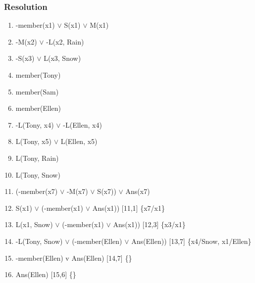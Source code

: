 \documentclass[compress, 9pt]{beamer}
\begin{document}
\begin{frame}
\frametitle{Resolution}
\label{sec-4-4}

\begin{enumerate}
\item -member(x1) $\vee$ S(x1) $\vee$ M(x1)
\item -M(x2) $\vee$ -L(x2, Rain)
\item -S(x3) $\vee$ L(x3, Snow)
\item member(Tony)
\item member(Sam)
\item member(Ellen)
\item -L(Tony, x4) $\vee$ -L(Ellen, x4)
\item L(Tony, x5) $\vee$ L(Ellen, x5)
\item L(Tony, Rain)
\item L(Tony, Snow)
\item (-member(x7) $\vee$ -M(x7) $\vee$ S(x7)) $\vee$ Ans(x7)
\item <2-> S(x1) $\vee$ (-member(x1) $\vee$ Ans(x1)) [11,1]      \{x7/x1\}
\item <3-> L(x1, Snow) $\vee$ (-member(x1) $\vee$ Ans(x1)) [12,3] \{x3/x1\}
\item <4-> -L(Tony, Snow) $\vee$ (-member(Ellen) $\vee$ Ans(Ellen)) [13,7] \{x4/Snow, x1/Ellen\}
\item <5-> -member(Ellen) v Ans(Ellen) [14,7] \{\}
\item <6 -> Ans(Ellen) [15,6] \{\}
\end{enumerate}
\end{frame}
\end{document}
